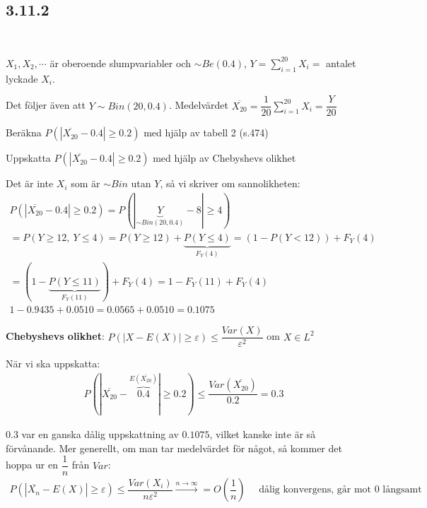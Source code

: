 \subsection{3.11.2}\hfill\\\par
\noindent $X_1,X_2,\cdots$ är oberoende slumpvariabler och $\sim Be(0.4)$, $Y = \sum_{i=1}^{20}X_i=$ antalet lyckade $X_i$.\par
\noindent Det följer även att $Y\sim Bin(20,0.4)$. Medelvärdet $\overline{X_{20}} = \dfrac{1}{20}\sum_{i=1}^{20}X_i = \dfrac{Y}{20}$
\par\bigskip
\noindent Beräkna $P(\left|\overline{X_{20}}-0.4\right|\geq0.2)$ med hjälp av tabell 2 (s.474)\par
\noindent Uppskatta $P(\left|\overline{X_{20}}-0.4\right|\geq0.2)$ med hjälp av Chebyshevs olikhet
\par\bigskip
\noindent Det är inte $X_i$ som är $\sim Bin$ utan $Y$, så vi skriver om sannolikheten:
\begin{equation*}
  \begin{gathered}
    P(\left|\overline{X_{20}}-0.4\right|\geq0.2) = P(\left|\underbrace{Y}_{\text{$\sim Bin(20,0.4)$}}-8\right|\geq4)\\
    =P(Y\geq12,\: Y\leq4) = P(Y\geq12)+\underbrace{P(Y\leq4)}_{\text{$F_Y(4)$}} = (1-P(Y<12))+F_Y(4)\\
    = (1-\underbrace{P(Y\leq11)}_{\text{$F_Y(11)$}})+F_Y(4) = 1-F_Y(11)+F_Y(4)\\
    1-0.9435+0.0510=0.0565+0.0510=0.1075
  \end{gathered}
\end{equation*}
\par\bigskip
\noindent\textbf{Chebyshevs olikhet}: $P(\left|X-E(X)\right|\geq\varepsilon)\leq\dfrac{Var(X)}{\varepsilon^2}$ om $X\in L^2$
\par\bigskip
\noindent När vi ska uppskatta:
\begin{equation*}
  \begin{gathered}
    P(\left|\overline{X_{20}}-\overbrace{0.4}^{\text{$E(\overline{X_{20}})$}}\right|\geq0.2)\leq\dfrac{Var(\overline{X_{20}})}{0.2} = 0.3
  \end{gathered}
\end{equation*}
\par\bigskip
\noindent  $0.3$ var en ganska dålig uppskattning av $0.1075$, vilket kanske inte är så förvånande. Mer generellt, om man tar medelvärdet för något, så kommer det hoppa ur en $\dfrac{1}{n}$ från $Var$:
\begin{equation*}
  \begin{gathered}
    P(\left|\overline{X_n}-E(X)\right|\geq\varepsilon) \leq \dfrac{Var(X_i)}{n\varepsilon^2}\stackrel{n\to\infty}{\rightarrow} = O\left(\dfrac{1}{n}\right)\quad\text{ dålig konvergens, går mot 0 långsamt}
  \end{gathered}
\end{equation*}

